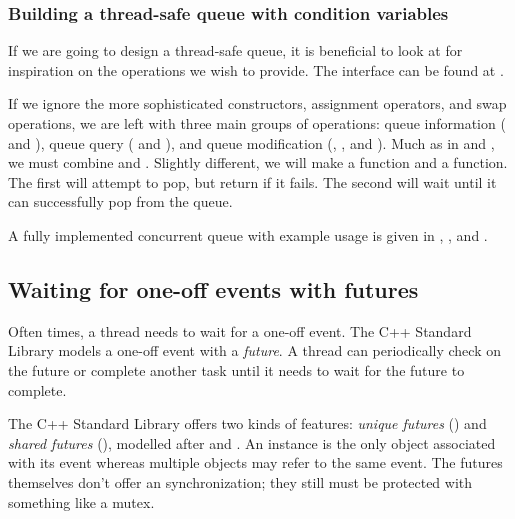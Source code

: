 \subsubsection{Building a thread-safe queue with condition variables}
If we are going to design a thread-safe queue, it is beneficial to look at  for inspiration on the operations we wish to provide. The  interface can be found at .

If we ignore the more sophisticated constructors, assignment operators, and swap operations, we are left with three main groups of operations: queue information ( and ), queue query ( and ), and queue modification (, , and ). Much as in  and , we must combine  and . Slightly different, we will make a  function and a  function. The first will attempt to pop, but return if it fails. The second will wait until it can successfully pop from the queue. 

A fully implemented concurrent queue with example usage is given in , , and .


\subsection{Waiting for one-off events with futures}
Often times, a thread needs to wait for a one-off event. The C++ Standard Library models a one-off event with a \emph{future}. A thread can periodically check on the future or complete another task until it needs to wait for the future to complete. 

The C++ Standard Library offers two kinds of features: \emph{unique futures} () and \emph{shared futures} (), modelled after  and . An  instance is the only object associated with its event whereas multiple  objects may refer to the same event. The futures themselves don't offer an synchronization; they still must be protected with something like a mutex.

